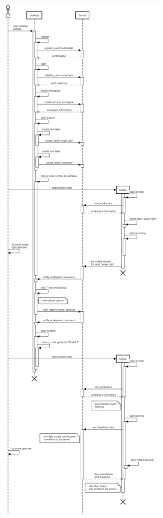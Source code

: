 \begin{center}
    \includegraphics[width=\textwidth,trim={0 23cm 0 37cm},clip]{charts/sequencefrank.png}
\end{center}
